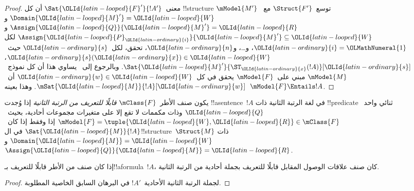 \documentclass[../../../include/open-logic-section]{subfiles}
\begin{document}
\begin{proof}
  معنى~$\Sat{{\OLId{latin-looped}{F}}'}{!A'}$ أن كل !!{structure}
  $\mModel{M'}$ توسع~$\Struct{F'}$ مع~$\Domain{{\OLId{latin-looped}{M}}'} = {\OLId{latin-looped}{W}}$
  و$\Assign{{\OLId{latin-looped}{Q}}}{{\OLId{latin-looped}{M}}'} = {\OLId{latin-looped}{R}}$ و$\Assign{{\OLId{latin-looped}{P}}_{\OLId{latin-ordinary}{i}}}{{\OLId{latin-looped}{M}}'} \subseteq {\OLId{latin-looped}{W}}$ لكل
  ${\OLId{latin-ordinary}{i}} = {\OLMathNumeral{1}}$، و\dots، و${\OLId{latin-ordinary}{n}}$، تحقق، لكل~${\OLId{latin-ordinary}{s}}$ حيث~${\OLId{latin-ordinary}{s}}({\OLId{latin-ordinary}{x}}) \in {\OLId{latin-looped}{W}}$،
  $\Sat{{\OLId{latin-looped}{M}}'}{\ST_{\OLId{latin-ordinary}{x}}(!A)}[{\OLId{latin-ordinary}{s}}]$. وبالرجوع إلى~
  يساوي هذا أن كل نموذج~$\mModel{M}$ مبني على~$\mModel{F}$
  يحقق في كل~${\OLId{latin-ordinary}{w}} \in {\OLId{latin-looped}{W}}$ أن~$\mSat{{\OLId{latin-looped}{M}}}{!A}[{\OLId{latin-ordinary}{w}}]$.
  وهذا بعينه~$\mModel{F} \Entails !A$.
\end{proof}

\begin{defn}
  يكون صنف الأطر~$\mClass{F}$ \emph{قابلًا للتعريف من الرتبة
  الثانية} إذا وُجدت !!a{sentence}~$!A$ في لغة الرتبة الثانية ذات
  !!{predicate} ثنائي واحد~${\OLId{latin-looped}{Q}}$ وذات مكممات لا تقع إلا على متغيرات
  مجموعات أحادية، بحيث~$\mModel{F} = \tuple{{\OLId{latin-looped}{W}}, {\OLId{latin-looped}{R}}} \in \mClass{F}$
  إذا وفقط إذا كان~$\Sat{{\OLId{latin-looped}{M}}}{!A}$ في ال!!{structure}~$\Struct{M}$ ذات
  $\Domain{{\OLId{latin-looped}{M}}} = {\OLId{latin-looped}{W}}$ و$\Assign{{\OLId{latin-looped}{Q}}}{{\OLId{latin-looped}{M}}} = {\OLId{latin-looped}{R}}$.
\end{defn}

\begin{cor}
  إذا كان صنف من الأطر قابلًا للتعريف بـ!!a{formula}~$!A$، كان صنف
  علاقات الوصول المقابل قابلًا للتعريف بجملة أحادية من الرتبة الثانية.
\end{cor}

\begin{proof}
  لجملة الرتبة الثانية الأحادية~$!A'$ في البرهان السابق الخاصية
  المطلوبة.
\end{proof}
\end{document}
